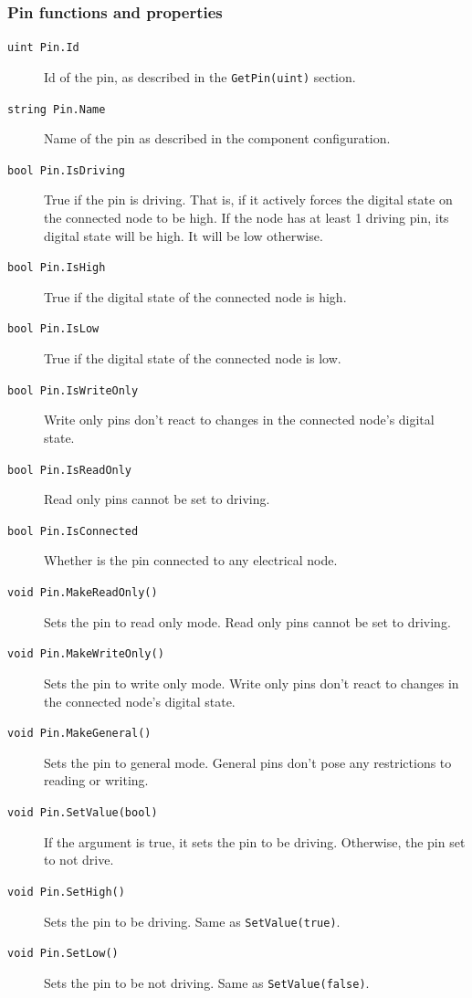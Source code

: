 \subsubsection{Pin functions and properties}
\begin{description}
    \item[\texttt{uint Pin.Id}]
    Id of the pin, as described in the \texttt{GetPin(uint)} section.

    \item[\texttt{string Pin.Name}]
    Name of the pin as described in the component configuration.

    \item[\texttt{bool Pin.IsDriving}]
    True if the pin is driving. That is, if it actively forces the digital state on the connected node to be high. If the node has at least 1 driving pin, its digital state will be high. It will be low otherwise.

    \item[\texttt{bool Pin.IsHigh}]
    True if the digital state of the connected node is high.

    \item[\texttt{bool Pin.IsLow}]
    True if the digital state of the connected node is low.

    \item[\texttt{bool Pin.IsWriteOnly}]
    Write only pins don't react to changes in the connected node's digital state.

    \item[\texttt{bool Pin.IsReadOnly}]
    Read only pins cannot be set to driving.

    \item[\texttt{bool Pin.IsConnected}]
    Whether is the pin connected to any electrical node.

    \item[\texttt{void Pin.MakeReadOnly()}]
    Sets the pin to read only mode. Read only pins cannot be set to driving.

    \item[\texttt{void Pin.MakeWriteOnly()}]
    Sets the pin to write only mode. Write only pins don't react to changes in the connected node's digital state.

    \item[\texttt{void Pin.MakeGeneral()}]
    Sets the pin to general mode. General pins don't pose any restrictions to reading or writing.

    \item[\texttt{void Pin.SetValue(bool)}]
    If the argument is true, it sets the pin to be driving. Otherwise, the pin set to not drive.

    \item[\texttt{void Pin.SetHigh()}]
    Sets the pin to be driving. Same as \texttt{SetValue(true)}.

    \item[\texttt{void Pin.SetLow()}]
    Sets the pin to be not driving. Same as \texttt{SetValue(false)}.
\end{description}

